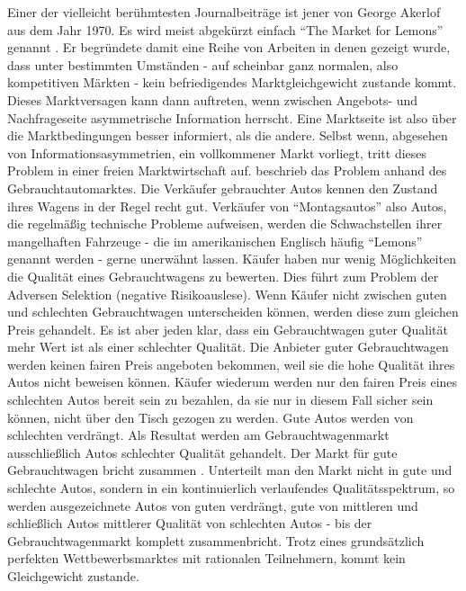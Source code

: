 Einer der vielleicht berühmtesten Journalbeiträge ist jener von George Akerlof aus dem Jahr 1970. Es wird meist abgekürzt einfach "`The Market for Lemons"' genannt \parencite{Akerlof1970}. Er begründete damit eine Reihe von Arbeiten in denen gezeigt wurde, dass unter bestimmten Umständen - auf scheinbar ganz normalen, also kompetitiven Märkten - kein befriedigendes Marktgleichgewicht zustande kommt. Dieses Marktversagen kann dann auftreten, wenn zwischen Angebots- und Nachfrageseite asymmetrische Information herrscht. Eine Marktseite ist also über die Marktbedingungen besser informiert, als die andere. Selbst wenn, abgesehen von Informationsasymmetrien, ein vollkommener Markt vorliegt, tritt dieses Problem in einer freien Marktwirtschaft auf. \textcite{Akerlof1970} beschrieb das Problem anhand des Gebrauchtautomarktes. Die Verkäufer gebrauchter Autos kennen den Zustand ihres Wagens in der Regel recht gut. Verkäufer von "`Montagsautos"'  also Autos, die regelmäßig technische Probleme aufweisen, werden die Schwachstellen ihrer mangelhaften Fahrzeuge - die im amerikanischen Englisch häufig "`Lemons"' genannt werden - gerne unerwähnt lassen. Käufer haben nur wenig Möglichkeiten die Qualität eines Gebrauchtwagens zu bewerten. Dies führt zum Problem der Adversen Selektion (negative Risikoauslese). Wenn Käufer nicht zwischen guten und schlechten Gebrauchtwagen unterscheiden können, werden diese zum gleichen Preis gehandelt. Es ist aber jeden klar, dass ein Gebrauchtwagen guter Qualität mehr Wert ist als einer schlechter Qualität. Die Anbieter guter Gebrauchtwagen werden keinen fairen Preis angeboten bekommen, weil sie die hohe Qualität ihres Autos nicht beweisen können. Käufer wiederum werden nur den fairen Preis eines schlechten Autos bereit sein zu bezahlen, da sie nur in diesem Fall sicher sein können, nicht über den Tisch gezogen zu werden. Gute Autos werden von schlechten verdrängt. Als Resultat werden am Gebrauchtwagenmarkt ausschließlich Autos schlechter Qualität gehandelt. Der Markt für gute Gebrauchtwagen bricht zusammen \parencite[S. 490]{Akerlof1970}. Unterteilt man den Markt nicht in gute und schlechte Autos, sondern in ein kontinuierlich verlaufendes Qualitätsspektrum, so werden  ausgezeichnete Autos von guten verdrängt, gute von mittleren und schließlich Autos mittlerer Qualität von schlechten Autos - bis der Gebrauchtwagenmarkt komplett zusammenbricht. Trotz eines grundsätzlich perfekten Wettbewerbsmarktes mit rationalen Teilnehmern, kommt kein Gleichgewicht zustande.

